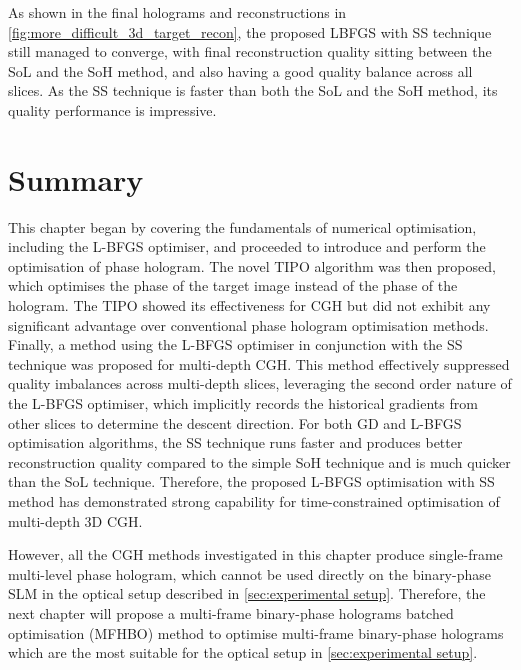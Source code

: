 As shown in the final holograms and reconstructions in \cref{fig:more_difficult_3d_target_recon}, the proposed LBFGS with SS technique still managed to converge, with final reconstruction quality sitting between the SoL and the SoH method, and also having a good quality balance across all slices. As the SS technique is faster than both the SoL and the SoH method, its quality performance is impressive.


\section{Summary}

This chapter began by covering the fundamentals of numerical optimisation, including the L-BFGS optimiser, and proceeded to introduce and perform the optimisation of phase hologram. The novel TIPO algorithm was then proposed, which optimises the phase of the target image instead of the phase of the hologram. The TIPO showed its effectiveness for CGH but did not exhibit any significant advantage over conventional phase hologram optimisation methods. Finally, a method using the L-BFGS optimiser in conjunction with the SS technique was proposed for multi-depth CGH. This method effectively suppressed quality imbalances across multi-depth slices, leveraging the second order nature of the L-BFGS optimiser, which implicitly records the historical gradients from other slices to determine the descent direction. For both GD and L-BFGS optimisation algorithms, the SS technique runs faster and produces better reconstruction quality compared to the simple SoH technique and is much quicker than the SoL technique. Therefore, the proposed L-BFGS optimisation with SS method has demonstrated strong capability for time-constrained optimisation of multi-depth 3D CGH.

However, all the CGH methods investigated in this chapter produce single-frame multi-level phase hologram, which cannot be used directly on the binary-phase SLM in the optical setup described in \cref{sec:experimental setup}. Therefore, the next chapter will propose a multi-frame binary-phase holograms batched optimisation (MFHBO) method to optimise multi-frame binary-phase holograms which are the most suitable for the optical setup in \cref{sec:experimental setup}.